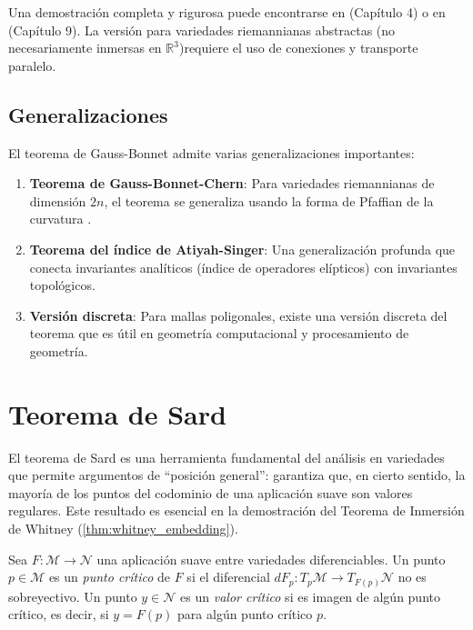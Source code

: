 \begin{remark}
Una demostración completa y rigurosa puede encontrarse en \citet{do1976differential}(Capítulo 4) o en \citet{lee2018introduction} (Capítulo 9). La versión para variedades riemannianas abstractas (no necesariamente inmersas en $\mathbb{R}^3$)requiere el uso de conexiones y transporte paralelo.
\end{remark}

\subsection{Generalizaciones}\label{subsec:gauss_bonnet_generalizaciones}

El teorema de Gauss-Bonnet admite varias generalizaciones importantes:

\begin{enumerate}
    \item \textbf{Teorema de Gauss-Bonnet-Chern}: Para variedades riemannianas de dimensión $2n$, el teorema se generaliza usando la forma de Pfaffian de la curvatura \citep{chern1944simple}.

    \item \textbf{Teorema del índice de Atiyah-Singer}: Una generalización profunda que conecta invariantes analíticos (índice de operadores elípticos) con invariantes topológicos.

    \item \textbf{Versión discreta}: Para mallas poligonales, existe una versión discreta del teorema que es útil en geometría computacional y procesamiento de geometría.
\end{enumerate}

\section{Teorema de Sard}\label{sec:sard}

El teorema de Sard es una herramienta fundamental del análisis en variedades que permite argumentos de ``posición general'': garantiza que, en cierto sentido, la mayoría de los puntos del codominio de una aplicación suave son valores regulares. Este resultado es esencial en la demostración del Teorema de Inmersión de Whitney (\autoref{thm:whitney_embedding}).

\begin{definition}\label{def:punto_critico}
Sea $F: \mathcal{M} \to \mathcal{N}$ una aplicación suave entre variedades diferenciables. Un punto $p \in \mathcal{M}$ es un \textit{punto crítico} de $F$ si el diferencial $dF_p: T_p\mathcal{M} \to T_{F(p)}\mathcal{N}$ no es sobreyectivo. Un punto $y \in \mathcal{N}$ es un \textit{valor crítico} si es imagen de algún punto crítico, es decir, si $y = F(p)$ para algún punto crítico $p$.
\end{definition}


